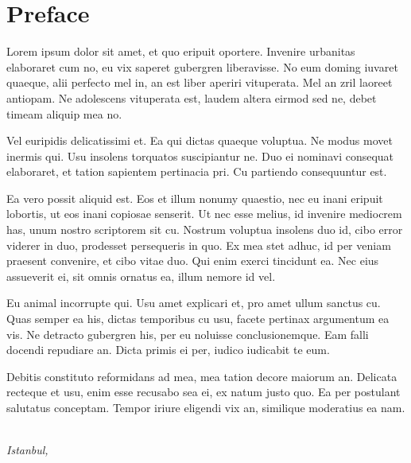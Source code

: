 \chapter*{Preface}

Lorem ipsum dolor sit amet, et quo eripuit oportere. Invenire urbanitas elaboraret cum no, eu vix saperet gubergren liberavisse. No eum doming iuvaret quaeque, alii perfecto mel in, an est liber aperiri vituperata. Mel an zril laoreet antiopam. Ne adolescens vituperata est, laudem altera eirmod sed ne, debet timeam aliquip mea no.

Vel euripidis delicatissimi et. Ea qui dictas quaeque voluptua. Ne modus movet inermis qui. Usu insolens torquatos suscipiantur ne. Duo ei nominavi consequat elaboraret, et tation sapientem pertinacia pri. Cu partiendo consequuntur est.

Ea vero possit aliquid est. Eos et illum nonumy quaestio, nec eu inani eripuit lobortis, ut eos inani copiosae senserit. Ut nec esse melius, id invenire mediocrem has, unum nostro scriptorem sit cu. Nostrum voluptua insolens duo id, cibo error viderer in duo, prodesset persequeris in quo. Ex mea stet adhuc, id per veniam praesent convenire, et cibo vitae duo. Qui enim exerci tincidunt ea. Nec eius assueverit ei, sit omnis ornatus ea, illum nemore id vel.

Eu animal incorrupte qui. Usu amet explicari et, pro amet ullum sanctus cu. Quas semper ea his, dictas temporibus cu usu, facete pertinax argumentum ea vis. Ne detracto gubergren his, per eu noluisse conclusionemque. Eam falli docendi repudiare an. Dicta primis ei per, iudico iudicabit te eum.

Debitis constituto reformidans ad mea, mea tation decore maiorum an. Delicata recteque et usu, enim esse recusabo sea ei, ex natum justo quo. Ea per postulant salutatus conceptam. Tempor iriure eligendi vix an, similique moderatius ea nam.

\begin{flushright}
{\makeatletter\itshape
    \@author \\
    Istanbul, \monthname{} \the\year{}
\makeatother}
\end{flushright}